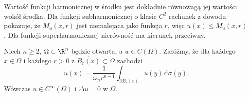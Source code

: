\begin{uwaga}
Wartość funkcji harmonicznej w środku jest dokładnie
równowagą jej wartości wokół środka. Dla funkcji
subharmonicznej o klasie $C^2$ rachunek z dowodu pokazuje,
że $M_u(x,r)$ jest niemalejąca jako funkcja $r$, więc
$u(x)\leq M_u(x,r)$. Dla funkcji superharmonicznej
nierówność ma kierunek przeciwny.
\end{uwaga}

\begin{twierdzenie}
\label{thm:pde-v31-continuous-mean}
Niech $n\ge2$, $\Omega\subset\R^n$ będzie otwarta,
a $u\in C(\Omega)$. Załóżmy, że dla każdego
$x\in\Omega$ i każdego $r>0$ z
$\overline{B_r(x)}\subset\Omega$ zachodzi
\[
 u(x)=\frac1{\omega_nr^{n-1}}
 \int_{\partial B_r(x)}u(y)\,\mathrm d\sigma(y).
\]
Wówczas $u\in C^\infty(\Omega)$ i $\Delta u=0$ w $\Omega$.
\end{twierdzenie}

